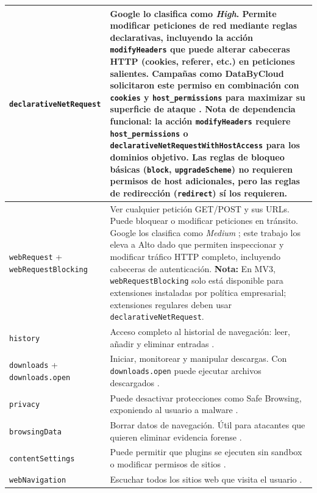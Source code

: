 \documentclass[12pt,oneside]{report}
\begin{document}
\begin{xltabular}{\textwidth}{|p{4.2cm}|X|}
\hline
\texttt{declarativeNetRequest} & Google lo clasifica como \textit{High}. Permite modificar peticiones de red mediante reglas declarativas, incluyendo la acción \texttt{modifyHeaders} que puede alterar cabeceras HTTP (cookies, referer, etc.) en peticiones salientes. Campañas como DataByCloud solicitaron este permiso en combinación con \texttt{cookies} y \texttt{host\_permissions} para maximizar su superficie de ataque \cite{pandya2026databycloud}. \textbf{Nota de dependencia funcional:} la acción \texttt{modifyHeaders} requiere \texttt{host\_permissions} o \texttt{declarativeNetRequestWithHostAccess} para los dominios objetivo. Las reglas de bloqueo básicas (\texttt{block}, \texttt{upgradeScheme}) no requieren permisos de host adicionales, pero las reglas de redirección (\texttt{redirect}) sí los requieren. \\
\hline
\texttt{webRequest} + \texttt{webRequestBlocking} & Ver cualquier petición GET/POST y sus URLs. Puede bloquear o modificar peticiones en tránsito. Google los clasifica como \textit{Medium} \cite{google_permission_risk}; este trabajo los eleva a Alto dado que permiten inspeccionar y modificar tráfico HTTP completo, incluyendo cabeceras de autenticación. \textbf{Nota:} En MV3, \texttt{webRequestBlocking} solo está disponible para extensiones instaladas por política empresarial; extensiones regulares deben usar \texttt{declarativeNetRequest}. \\
\hline
\texttt{history} & Acceso completo al historial de navegación: leer, añadir y eliminar entradas \cite{google_permission_risk}. \\
\hline
\texttt{downloads} + \texttt{downloads.open} & Iniciar, monitorear y manipular descargas. Con \texttt{downloads.open} puede ejecutar archivos descargados \cite{google_permission_risk}. \\
\hline
\texttt{privacy} & Puede desactivar protecciones como Safe Browsing, exponiendo al usuario a malware \cite{google_permission_risk}. \\
\hline
\texttt{browsingData} & Borrar datos de navegación. Útil para atacantes que quieren eliminar evidencia forense \cite{google_permission_risk}. \\
\hline
\texttt{contentSettings} & Puede permitir que plugins se ejecuten sin sandbox o modificar permisos de sitios \cite{google_permission_risk}. \\
\hline
\texttt{webNavigation} & Escuchar todos los sitios web que visita el usuario \cite{google_permission_risk}. \\
\hline

\end{xltabular}
\end{document}

